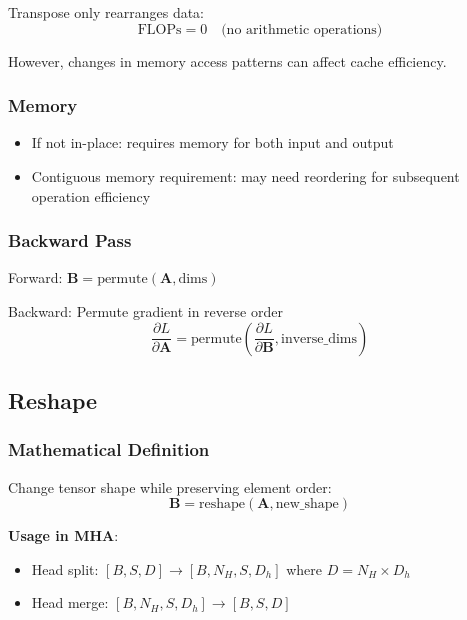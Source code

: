 \documentclass[10pt]{article}
\begin{document}
Transpose only rearranges data:
\begin{equation}
\text{FLOPs} = 0 \quad \text{(no arithmetic operations)}
\end{equation}

However, changes in memory access patterns can affect cache efficiency.

\subsubsection{Memory}

\begin{itemize}
  \item If not in-place: requires memory for both input and output
  \item Contiguous memory requirement: may need reordering for subsequent operation efficiency
\end{itemize}

\subsubsection{Backward Pass}

Forward: $\mathbf{B} = \text{permute}(\mathbf{A}, \text{dims})$

Backward: Permute gradient in reverse order
\begin{equation}
\frac{\partial L}{\partial \mathbf{A}} = \text{permute}\left(\frac{\partial L}{\partial \mathbf{B}}, \text{inverse\_dims}\right)
\end{equation}

\subsection{Reshape}
\label{subsec:reshape}

\subsubsection{Mathematical Definition}

Change tensor shape while preserving element order:
\begin{equation}
\mathbf{B} = \text{reshape}(\mathbf{A}, \text{new\_shape})
\end{equation}

\textbf{Usage in MHA}:
\begin{itemize}
  \item Head split: $[B,S,D] \rightarrow [B,N_H,S,D_h]$ where $D = N_H \times D_h$
  \item Head merge: $[B,N_H,S,D_h] \rightarrow [B,S,D]$
\end{itemize}
\end{document}

